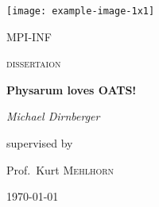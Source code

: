 \begin{titlepage}
	\centering
	\texttt{[image: example-image-1x1]}\par\vspace{1cm}
	{\scshape\LARGE MPI-INF \par}
	\vspace{1cm}
	{\scshape\Large dissertaion\par}
	\vspace{1.5cm}
	{\huge\bfseries Physarum loves OATS!\par}
	\vspace{2cm}
	{\Large\itshape Michael Dirnberger\par}
	\vfill
	supervised by\par
	Prof.~Kurt \textsc{Mehlhorn}

	\vfill

	{\large \today\par}
\end{titlepage}